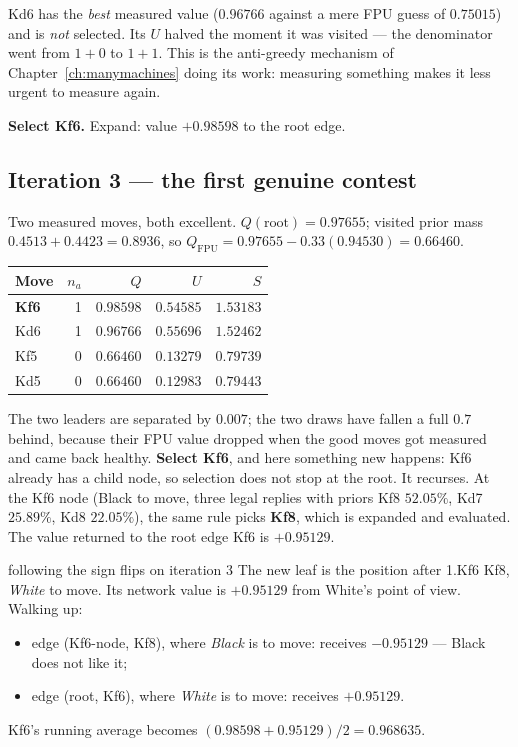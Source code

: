 \begin{keyidea}
Kd6 has the \emph{best} measured value ($0.96766$ against a mere FPU guess of $0.75015$) and
is \emph{not} selected. Its $U$ halved the moment it was visited --- the denominator went
from $1+0$ to $1+1$. This is the anti-greedy mechanism of Chapter~\ref{ch:manymachines}
doing its work: measuring something makes it less urgent to measure again.
\end{keyidea}

\textbf{Select Kf6.} Expand: value $+0.98598$ to the root edge.

\subsection*{Iteration 3 --- the first genuine contest}

Two measured moves, both excellent. $Q(\text{root}) = 0.97655$; visited prior mass
$0.4513+0.4423 = 0.8936$, so $Q_{\text{FPU}} = 0.97655 - 0.33(0.94530) = 0.66460$.

\begin{center}
\begin{tabular}{@{}lrrrr@{}}
\toprule
Move & $n_a$ & $Q$ & $U$ & $S$ \\
\midrule
\textbf{Kf6} & 1 & $0.98598$ & $0.54585$ & $\mathbf{1.53183}$ \\
Kd6 & 1 & $0.96766$ & $0.55696$ & $1.52462$ \\
Kf5 & 0 & $0.66460$ & $0.13279$ & $0.79739$ \\
Kd5 & 0 & $0.66460$ & $0.12983$ & $0.79443$ \\
\bottomrule
\end{tabular}
\end{center}

The two leaders are separated by $0.007$; the two draws have fallen a full $0.7$ behind,
because their FPU value dropped when the good moves got measured and came back healthy.
\textbf{Select Kf6}, and here something new happens: Kf6 already has a child node, so
selection does not stop at the root. It recurses. At the Kf6 node (Black to move, three legal
replies with priors Kf8 $52.05\%$, Kd7 $25.89\%$, Kd8 $22.05\%$), the same rule picks
\textbf{Kf8}, which is expanded and evaluated. The value returned to the root edge Kf6 is
$+0.95129$.

\begin{worked}{following the sign flips on iteration 3}
The new leaf is the position after 1.Kf6 Kf8, \emph{White} to move. Its network value is
$+0.95129$ from White's point of view. Walking up:
\begin{itemize}
\item edge (Kf6-node, Kf8), where \emph{Black} is to move: receives $-0.95129$ --- Black does
  not like it;
\item edge (root, Kf6), where \emph{White} is to move: receives $+0.95129$.
\end{itemize}
Kf6's running average becomes $(0.98598 + 0.95129)/2 = 0.968635$.
\end{worked}

